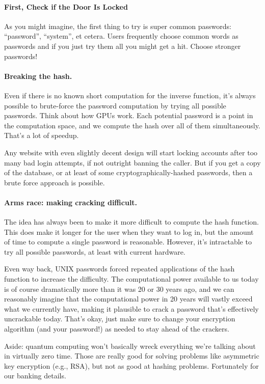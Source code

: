 \paragraph{First, Check if the Door Is Locked}
As you might imagine, the first thing to try is super common passwords: ``password'', ``system'', et cetera. Users frequently choose common words as passwords and if you just try them all you might get a hit. Choose stronger passwords!

\paragraph{Breaking the hash.} Even if there is no known short computation for the
inverse function, it's always possible to brute-force the password
computation by trying all possible passwords. Think about how GPUs
work. Each potential password is a point in the computation space, and
we compute the hash over all of them simultaneously.  That's a lot of
speedup.

Any website with even slightly decent design will start locking accounts after too many bad login attempts, if not outright banning the caller. But if you get a copy of the database, or at least of some cryptographically-hashed passwords, then a brute force approach is possible.

\paragraph{Arms race: making cracking difficult.} The idea has always been
to make it more difficult to compute the hash function. This does make it longer for the user when they want to log in, but the amount of time to compute a single password is reasonable. However, it's intractable to try all possible passwords, at least with current hardware. 

Even way back,
UNIX passwords forced repeated applications of the hash function to increase the difficulty. The computational power available to us today is of course dramatically more than it was 20 or 30 years ago, and we can reasonably imagine that the computational power in 20 years will vastly exceed what we currently have, making it plausible to crack a password that's effectively uncrackable today. That's okay, just make sure to change your encryption algorithm (and your password!) as needed to stay ahead of the crackers.

Aside: quantum computing won't basically wreck everything we're talking about in virtually zero time. Those are really good for solving problems like asymmetric key encryption (e.g., RSA), but not as good at hashing problems. Fortunately for our banking details.

